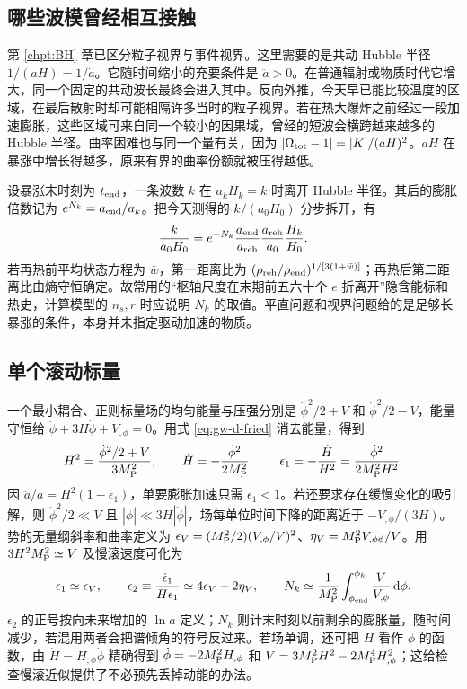 \subsection{哪些波模曾经相互接触}

第 \ref{chpt:BH} 章已区分粒子视界与事件视界。这里需要的是共动 Hubble 半径 $1/(aH)=1/\dot a$。它随时间缩小的充要条件是 $\ddot a>0$。在普通辐射或物质时代它增大，同一个固定的共动波长最终会进入其中。反向外推，今天早已能比较温度的区域，在最后散射时却可能相隔许多当时的粒子视界。若在热大爆炸之前经过一段加速膨胀，这些区域可来自同一个较小的因果域，曾经的短波会横跨越来越多的 Hubble 半径。曲率困难也与同一个量有关，因为 $|\Omega_{\rm tot}-1|=|K|/(aH)^2$。$aH$ 在暴涨中增长得越多，原来有界的曲率份额就被压得越低。

设暴涨末时刻为 $t_{\rm end}$，一条波数 $k$ 在 $a_kH_k=k$ 时离开 Hubble 半径。其后的膨胀倍数记为 $e^{N_k}=a_{\rm end}/a_k$。把今天测得的 $k/(a_0H_0)$ 分步拆开，有
\[
 \frac{k}{a_0H_0}=e^{-N_k}
 \frac{a_{\rm end}}{a_{\rm reh}}\frac{a_{\rm reh}}{a_0}\frac{H_k}{H_0}.
\]
若再热前平均状态方程为 $\bar w$，第一距离比为 $(\rho_{\rm reh}/\rho_{\rm end})^{1/[3(1+\bar w)]}$；再热后第二距离比由熵守恒确定。故常用的“枢轴尺度在末期前五六十个 $e$ 折离开”隐含能标和热史，计算模型的 $n_s,r$ 时应说明 $N_k$ 的取值。平直问题和视界问题给的是足够长暴涨的条件，本身并未指定驱动加速的物质。

\subsection{单个滚动标量}

一个最小耦合、正则标量场的均匀能量与压强分别是 $\dot\phi^2/2+V$ 和 $\dot\phi^2/2-V$，能量守恒给 $\ddot\phi+3H\dot\phi+V_{,\phi}=0$。用式 \eqref{eq:gw-d-fried} 消去能量，得到
\begin{equation}\label{eq:gw-d-slow}
 H^2=\frac{\dot\phi^2/2+V}{3M_{\rm P}^2},\qquad
 \dot H=-\frac{\dot\phi^2}{2M_{\rm P}^2},\qquad
 \epsilon_1=-\frac{\dot H}{H^2}
          =\frac{\dot\phi^2}{2M_{\rm P}^2H^2}.
\end{equation}
因 $\ddot a/a=H^2(1-\epsilon_1)$，单要膨胀加速只需 $\epsilon_1<1$。若还要求存在缓慢变化的吸引解，则 $\dot\phi^2/2\ll V$ 且 $|\ddot\phi|\ll3H|\dot\phi|$，场每单位时间下降的距离近于 $-V_{,\phi}/(3H)$。势的无量纲斜率和曲率定义为 $\epsilon_V=(M_{\rm P}^2/2)(V_{,\phi}/V)^2$、$\eta_V=M_{\rm P}^2V_{,\phi\phi}/V$。用 $3H^2M_{\rm P}^2\simeq V$ 及慢滚速度可化为
\[
 \epsilon_1\simeq\epsilon_V,\qquad
 \epsilon_2\equiv\frac{\dot\epsilon_1}{H\epsilon_1}
 \simeq4\epsilon_V-2\eta_V,\qquad
 N_k\simeq\frac{1}{M_{\rm P}^2}\int_{\phi_{\rm end}}^{\phi_k}
           \frac{V}{V_{,\phi}}\,\mathrm d\phi .
\]
$\epsilon_2$ 的正号按向未来增加的 $\ln a$ 定义；$N_k$ 则计末时刻以前剩余的膨胀量，随时间减少，若混用两者会把谱倾角的符号反过来。若场单调，还可把 $H$ 看作 $\phi$ 的函数，由 $\dot H=H_{,\phi}\dot\phi$ 精确得到 $\dot\phi=-2M_{\rm P}^2 H_{,\phi}$ 和 $V=3M_{\rm P}^2 H^2-2M_{\rm P}^4 H_{,\phi}^2$；这给检查慢滚近似提供了不必预先丢掉动能的办法。

